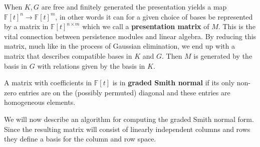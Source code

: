When $K,G$ are free and finitely generated the presentation yields a map $\mathbb{F}[t]^{n} \to \mathbb{F}[t]^{m}$, in other words it can for a given choice of bases be represented by a matrix in $\mathbb{F}[t]^{n \times m}$ which we call a \textbf{presentation matrix} of $M$. This is the vital connection between persistence modules and linear algebra. By reducing this matrix, much like in the process of Gaussian elimination, we end up with a matrix that describes compatible bases in $K$ and $G$. Then $M$ is generated by the basis in $G$ with relations given by the basis in $K$.

\begin{definition}
A matrix with coefficients in $\mathbb{F}[t]$ is in \textbf{graded Smith normal} if its only non-zero entries are on the (possibly permuted) diagonal and these entries are homogeneous elements.
\end{definition}

We will now describe an algorithm for computing the graded Smith normal form. Since the resulting matrix will consist of linearly independent columns and rows they define a basis for the column and row space.

